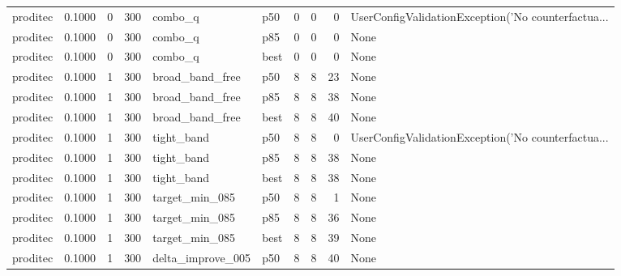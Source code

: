 \begin{tabular}{lrrrllrrrl}
proditec &    0.1000 &    0 &    300 &              combo\_q &    p50 &               0 &          0 &       0 & UserConfigValidationException('No counterfactua... \\
proditec &    0.1000 &    0 &    300 &              combo\_q &    p85 &               0 &          0 &       0 &                                               None \\
proditec &    0.1000 &    0 &    300 &              combo\_q &   best &               0 &          0 &       0 &                                               None \\
proditec &    0.1000 &    1 &    300 &      broad\_band\_free &    p50 &               8 &          8 &      23 &                                               None \\
proditec &    0.1000 &    1 &    300 &      broad\_band\_free &    p85 &               8 &          8 &      38 &                                               None \\
proditec &    0.1000 &    1 &    300 &      broad\_band\_free &   best &               8 &          8 &      40 &                                               None \\
proditec &    0.1000 &    1 &    300 &           tight\_band &    p50 &               8 &          8 &       0 & UserConfigValidationException('No counterfactua... \\
proditec &    0.1000 &    1 &    300 &           tight\_band &    p85 &               8 &          8 &      38 &                                               None \\
proditec &    0.1000 &    1 &    300 &           tight\_band &   best &               8 &          8 &      38 &                                               None \\
proditec &    0.1000 &    1 &    300 &       target\_min\_085 &    p50 &               8 &          8 &       1 &                                               None \\
proditec &    0.1000 &    1 &    300 &       target\_min\_085 &    p85 &               8 &          8 &      36 &                                               None \\
proditec &    0.1000 &    1 &    300 &       target\_min\_085 &   best &               8 &          8 &      39 &                                               None \\
proditec &    0.1000 &    1 &    300 &    delta\_improve\_005 &    p50 &               8 &          8 &      40 &                                               None \\

\end{tabular}

